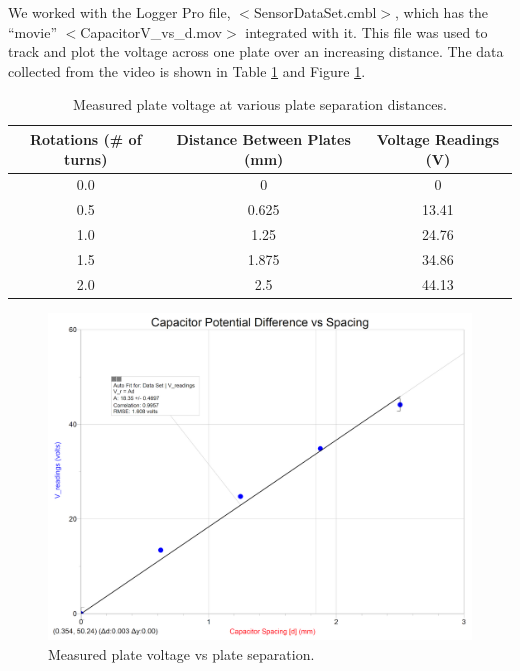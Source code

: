 \documentclass[oneside,12pt]{amsart}
\begin{document}
	\indent We worked with the Logger Pro file, $<$SensorDataSet.cmbl$>$, which has the “movie” $<$CapacitorV\_vs\_d.mov$>$ integrated with it. This file was used to track and plot the voltage across one plate over an increasing distance. The data collected from the video is shown in Table \ref{Volt} and Figure \ref{VvD}.\\
	
	\begin{table}[h]
		\begin{tabular}{|c|c|c|}
			\hline
			Rotations (\# of turns) & Distance Between Plates (mm) & Voltage Readings (V)\\
			\hline
			0.0&0&0\\
			0.5&0.625&13.41\\
			1.0 &1.25&24.76\\
			1.5 &1.875&34.86\\
			2.0&2.5&44.13\\
			\hline
		\end{tabular}
		\caption{Measured plate voltage at various plate separation distances.} 
		\label{Volt}
	\end{table}

\begin{figure}[H]
	\includegraphics[width=\medgraph,scale=0.01]{VoltvDistance.png}
	\caption{Measured plate voltage vs plate separation.}
	\label{VvD}
\end{figure}
\end{document}
